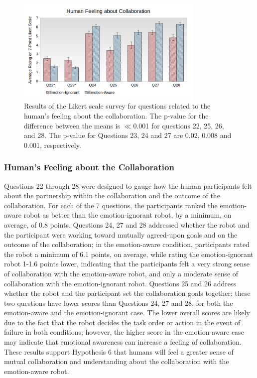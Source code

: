 \documentclass[12pt]{report}
\begin{document}
\begin{figure}
\centering
\includegraphics[width=0.8\textwidth]{figure/Overall-Collaboration.png}
\caption{\fontsize{10}{10}\selectfont Results of the Likert scale survey for
questions related to the human's feeling about the collaboration. The p-value
for the difference between the means is $\ll$0.001 for questions 22, 25, 26, and
28. The p-value for Questions 23, 24 and 27 are 0.02, 0.008 and 0.001,
respectively.}
\label{fig:overall-collaboration}
\end{figure}

\subsubsection{Human's Feeling about the Collaboration}
\label{sec:Collaboration}
Questions 22 through 28 were designed to gauge how the human participants
felt about the partnership within the collaboration and the outcome of the
collaboration. For each of the 7 questions, the participants ranked the
emotion-aware robot as better than the emotion-ignorant robot, by a minimum,
on average, of 0.8 points. Questions 24, 27 and 28 addressed whether the robot
and the participant were working toward mutually agreed-upon goals and on the
outcome of the collaboration; in the emotion-aware condition, participants rated
the robot a minimum of 6.1 points, on average, while rating the emotion-ignorant
robot 1-1.6 points lower, indicating that the participants felt a very strong
sense of collaboration with the emotion-aware robot, and only a moderate sense
of collaboration with the emotion-ignorant robot. Questions 25 and 26 address
whether the robot and the participant set the collaboration goals together;
these two questions have lower scores than Questions 24, 27 and 28, for both the
emotion-aware and the emotion-ignorant case. The lower overall scores are
likely due to the fact that the robot decides the task order or action in the
event of failure in both conditions; however, the higher score in the
emotion-aware case may indicate that emotional awareness can increase a feeling
of collaboration. These results support Hypothesis 6 that humans will feel
a greater sense of mutual collaboration and understanding about the
collaboration with the emotion-aware robot.
\end{document}
